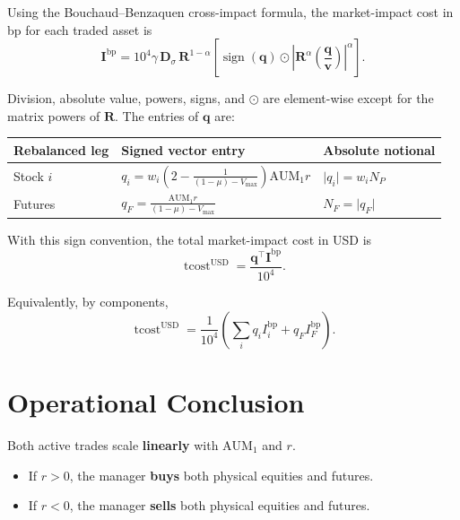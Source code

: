 \documentclass[11pt]{article}
\begin{document}
Using the Bouchaud--Benzaquen cross-impact formula, the market-impact cost in bp
for each traded asset is
\[
  \mathbf{I}^{\mathrm{bp}}
  = 10^4\gamma\,\mathbf{D}_{\sigma}\,\mathbf{R}^{1-\alpha}
  \left[
  \operatorname{sign}(\mathbf{q}) \odot
  \left|\mathbf{R}^{\alpha}\left(\frac{\mathbf{q}}{\mathbf{v}}\right)\right|^{\alpha}
  \right].
\]

Division, absolute value, powers, signs, and $\odot$ are element-wise except for
the matrix powers of $\mathbf{R}$. The entries of $\mathbf{q}$ are:

\begin{center}
\small
\renewcommand{\arraystretch}{2.25}
\begin{tabular}{@{}p{}p{}p{}@{}}
\toprule
Rebalanced leg & Signed vector entry & Absolute notional \\
\midrule
Stock $i$ &
$q_i = w_i\left(2 - \frac{1}{(1 - \mu) - V_{\mathrm{max}}}\right)
\mathrm{AUM}_1r$ &
$\lvert q_i\rvert = w_iN_P$ \\
Futures &
$q_F = \frac{\mathrm{AUM}_1r}{(1 - \mu) - V_{\mathrm{max}}}$ &
$N_F = \lvert q_F\rvert$ \\
\bottomrule
\end{tabular}
\end{center}

With this sign convention, the total market-impact cost in USD is
\[
  \operatorname{tcost}^{\mathrm{USD}}
  = \frac{\mathbf{q}^{\top}\mathbf{I}^{\mathrm{bp}}}{10^4}.
\]

Equivalently, by components,
\[
  \operatorname{tcost}^{\mathrm{USD}}
  = \frac{1}{10^4}
  \left(\sum_i q_i I_i^{\mathrm{bp}} + q_F I_F^{\mathrm{bp}}\right).
\]

\section{Operational Conclusion}

Both active trades scale \textbf{linearly} with $\mathrm{AUM}_1$ and $r$.

\begin{itemize}
  \item If $r > 0$, the manager \textbf{buys} both physical equities and futures.
  \item If $r < 0$, the manager \textbf{sells} both physical equities and futures.
\end{itemize}
\end{document}
